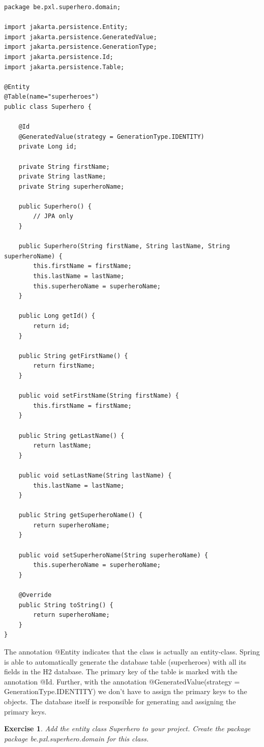 \documentclass[a4paper, 12pt]{report}
\newenvironment{boxexercise}
{\begin{tcolorbox}
[enhanced jigsaw,breakable,pad at break*=1mm,
 colback=tsyellow!20,boxrule=0pt,frame hidden]}
{\end{tcolorbox}}
\newtheorem{envoefening}{\textbf{Exercise}}[chapter]
\newenvironment{oefening}
               {\begin{boxexercise}\begin{envoefening}}
               {\end{envoefening}\end{boxexercise}}
\begin{document}
\begin{lstlisting}[frame=single]
package be.pxl.superhero.domain;

import jakarta.persistence.Entity;
import jakarta.persistence.GeneratedValue;
import jakarta.persistence.GenerationType;
import jakarta.persistence.Id;
import jakarta.persistence.Table;

@Entity
@Table(name="superheroes")
public class Superhero {
	
	@Id
	@GeneratedValue(strategy = GenerationType.IDENTITY)
	private Long id;
	
	private String firstName;
	private String lastName;
	private String superheroName;

	public Superhero() {
		// JPA only
	}

	public Superhero(String firstName, String lastName, String superheroName) {
		this.firstName = firstName;
		this.lastName = lastName;
		this.superheroName = superheroName;
	}

	public Long getId() {
		return id;
	}

	public String getFirstName() {
		return firstName;
	}

	public void setFirstName(String firstName) {
		this.firstName = firstName;
	}

	public String getLastName() {
		return lastName;
	}

	public void setLastName(String lastName) {
		this.lastName = lastName;
	}

	public String getSuperheroName() {
		return superheroName;
	}

	public void setSuperheroName(String superheroName) {
		this.superheroName = superheroName;
	}

	@Override
	public String toString() {
		return superheroName;
	}
}
\end{lstlisting}

The annotation @Entity indicates that the class is actually an entity-class.  Spring is able to automatically generate the database table (superheroes) with all its fields in the H2 database. 
The primary key of the table is marked with the annotation @Id.  Further, with the annotation @GeneratedValue(strategy = GenerationType.IDENTITY) we don't have to assign the primary keys to the objects. The database itself is responsible for generating and assigning the primary keys.

\begin{oefening}
Add the entity class Superhero to your project.  Create the package package \textit{be.pxl.superhero.domain} for this class.
\end{oefening}
\end{document}
